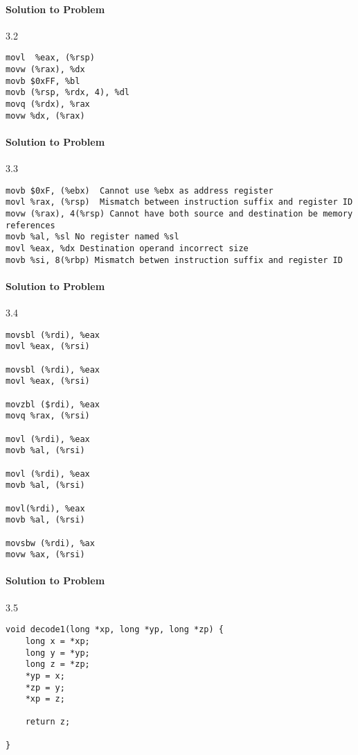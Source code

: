 \documentclass{report}
\begin{document}
\paragraph{Solution to Problem } 3.2 \\
\begin{lstlisting}
movl  %eax, (%rsp)
movw (%rax), %dx
movb $0xFF, %bl
movb (%rsp, %rdx, 4), %dl
movq (%rdx), %rax
movw %dx, (%rax)

\end{lstlisting}

\paragraph{Solution to Problem } 3.3 \\

\begin{lstlisting}
movb $0xF, (%ebx)  Cannot use %ebx as address register
movl %rax, (%rsp)  Mismatch between instruction suffix and register ID
movw (%rax), 4(%rsp) Cannot have both source and destination be memory references
movb %al, %sl No register named %sl
movl %eax, %dx Destination operand incorrect size
movb %si, 8(%rbp) Mismatch betwen instruction suffix and register ID

\end{lstlisting}


\paragraph{Solution to Problem } 3.4 \\
\begin{lstlisting}
movsbl (%rdi), %eax  
movl %eax, (%rsi)

movsbl (%rdi), %eax
movl %eax, (%rsi)

movzbl ($rdi), %eax
movq %rax, (%rsi)

movl (%rdi), %eax
movb %al, (%rsi)

movl (%rdi), %eax
movb %al, (%rsi)

movl(%rdi), %eax
movb %al, (%rsi)

movsbw (%rdi), %ax
movw %ax, (%rsi)
\end{lstlisting}

\paragraph{Solution to Problem } 3.5 \\
\begin{lstlisting}
void decode1(long *xp, long *yp, long *zp) {
    long x = *xp;
    long y = *yp;
    long z = *zp;
    *yp = x;
    *zp = y;
    *xp = z;
    
    return z;

}


\end{lstlisting}
\end{document}
